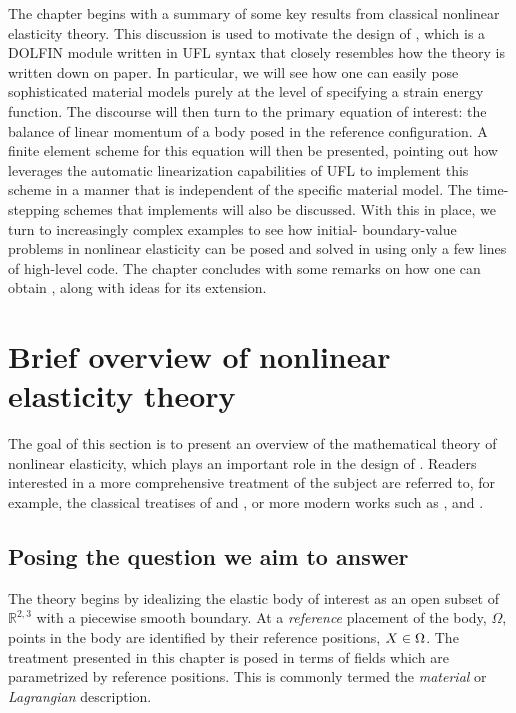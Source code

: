 The chapter begins with a summary of some key results from classical
nonlinear elasticity theory. This discussion is used to motivate the
design of \twist, which is a DOLFIN \citep{LoggWells2010} module
written in UFL syntax \citep{AlnaesLogg2009} that closely resembles
how the theory is written down on paper. In particular, we will see
how one can easily pose sophisticated material models purely at the
level of specifying a strain energy function. The discourse will then
turn to the primary equation of interest: the balance of linear
momentum of a body posed in the reference configuration. A finite
element scheme for this equation will then be presented, pointing out
how \twist{} leverages the automatic linearization capabilities of UFL
to implement this scheme in a manner that is independent of the
specific material model. The time-stepping schemes that \twist{}
implements will also be discussed. With this in place, we turn to
increasingly complex examples to see how initial- boundary-value
problems in nonlinear elasticity can be posed and solved in \twist{}
using only a few lines of high-level code. The chapter concludes with
some remarks on how one can obtain \twist, along with ideas for its
extension.

\section{Brief overview of nonlinear elasticity theory}

The goal of this section is to present an overview of the mathematical
theory of nonlinear elasticity, which plays an important role in the
design of \twist. Readers interested in a more comprehensive treatment
of the subject are referred to, for example, the classical treatises
of \citet{TruesdellToupin1960} and \citet{TruesdellNoll1965}, or more
modern works such as \citet{Gurtin1981}, \citet{Ogden1997} and
\citet{Holzapfel2000}.

\subsection{Posing the question we aim to answer}

The theory begins by idealizing the elastic body of interest as an open
subset of $\mathbb{R}^{2, 3}$ with a piecewise smooth boundary. At a
{\em reference} placement of the body, $\Omega$, points in the body
are identified by their reference positions, $\mbox{$ X$} \in \Omega$. The
treatment presented in this chapter is posed in terms of fields which
are parametrized by reference positions. This is commonly termed the
{\em material} or {\em Lagrangian} description.

